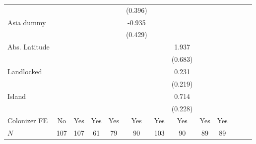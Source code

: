 \begin{sidewaystable}[h!]
\begin{threeparttable}
\begin{center}
\begin{minipage}{\textwidth}
\begin{tabular*}{\textwidth}{@{\extracolsep{\fill}}lcccccccccccc@{\extracolsep{\fill}}}
            &                     &                     &                     &                     &     (0.396)         &                     &                     &                     &                     \\
[0.125em]
Asia dummy        &                     &                     &                     &                     &      -0.935\sym{**} &                     &                     &                     &                     \\
            &                     &                     &                     &                     &     (0.429)         &                     &                     &                     &                     \\
[0.125em]
Abs. Latitude    &                     &                     &                     &                     &                     &                     &       1.937\sym{***} &                     &                     \\
            &                     &                     &                     &                     &                     &                     &     (0.683)         &                     &                     \\
[0.125em]
Landlocked    &                     &                     &                     &                     &                     &                     &       0.231         &                     &                     \\
            &                     &                     &                     &                     &                     &                     &     (0.219)         &                     &                     \\
[0.125em]
Island    &                     &                     &                     &                     &                     &                     &       0.714\sym{***}         &                     &                     \\
            &                     &                     &                     &                     &                     &                     &     (0.228)         &                     &                     \\
[0.25em]
Colonizer FE & No & Yes & Yes& Yes& Yes& Yes& Yes& Yes& Yes\\
\hline
\(N\)       &         107         &         107         &          61         &          79         &          90         &         103         &          90         &          89         &          89         \\

\end{tabular*}
\end{minipage}
\end{center}
\end{threeparttable}
\end{sidewaystable}
